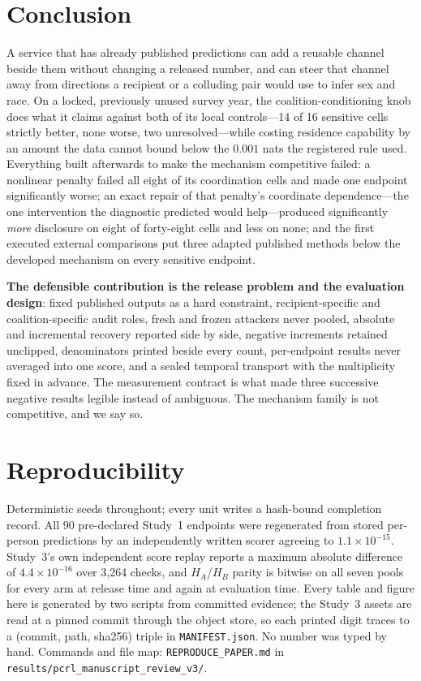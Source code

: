 \documentclass[10pt]{article}
\begin{document}
\section{Conclusion}

A service that has already published predictions can add a reusable channel beside them without
changing a released number, and can steer that channel away from directions a recipient or a colluding
pair would use to infer sex and race. On a locked, previously unused survey year, the
coalition-conditioning knob does what it claims against both of its local controls---14 of 16 sensitive
cells strictly better, none worse, two unresolved---while costing residence capability by an amount the
data cannot bound below the $0.001$ nats the registered rule used. Everything built afterwards to make
the mechanism competitive failed: a nonlinear penalty failed all eight of its coordination cells and
made one endpoint significantly worse; an exact repair of that penalty's coordinate dependence---the
one intervention the diagnostic predicted would help---produced significantly \emph{more} disclosure on
eight of forty-eight cells and less on none; and the first executed external comparisons put three adapted published
methods below the developed mechanism on every sensitive endpoint.

\textbf{The defensible contribution is the release problem and the evaluation design}: fixed published
outputs as a hard constraint, recipient-specific and coalition-specific audit roles, fresh and frozen
attackers never pooled, absolute and incremental recovery reported side by side, negative increments
retained unclipped, denominators printed beside every count, per-endpoint results never averaged into
one score, and a sealed temporal transport with the multiplicity fixed in advance. The measurement
contract is what made three successive negative results legible instead of ambiguous. The mechanism
family is not competitive, and we say so.

\section{Reproducibility}

Deterministic seeds throughout; every unit writes a hash-bound completion record. All 90 pre-declared
Study~1 endpoints were regenerated from stored per-person predictions by an independently written
scorer agreeing to $1.1\times10^{-15}$. Study~3's own independent score replay reports a maximum
absolute difference of $4.4\times10^{-16}$ over 3{,}264 checks, and $H_A$/$H_B$ parity is bitwise on
all seven pools for every arm at release time and again at evaluation time. Every table and figure
here is generated by two scripts from committed evidence; the Study~3 assets are read at a pinned
commit through the object store, so each printed digit traces to a (commit, path, sha256) triple in
\texttt{MANIFEST.json}. No number was typed by hand. Commands and file map:
\texttt{REPRODUCE\_PAPER.md} in \texttt{results/pcrl\_manuscript\_review\_v3/}.
\end{document}
